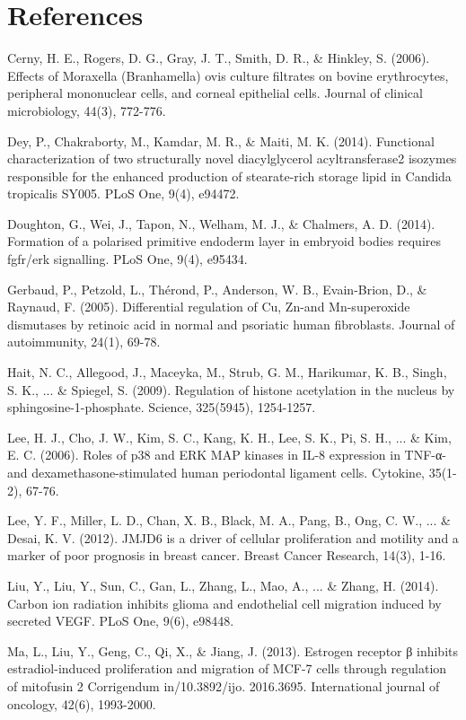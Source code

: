 \documentclass{article}
\begin{document}
\section{References}

Cerny, H. E., Rogers, D. G., Gray, J. T., Smith, D. R., \& Hinkley, S. (2006). Effects of Moraxella (Branhamella) ovis culture filtrates on bovine erythrocytes, peripheral mononuclear cells, and corneal epithelial cells. Journal of clinical microbiology, 44(3), 772-776.

Dey, P., Chakraborty, M., Kamdar, M. R., \& Maiti, M. K. (2014). Functional characterization of two structurally novel diacylglycerol acyltransferase2 isozymes responsible for the enhanced production of stearate-rich storage lipid in Candida tropicalis SY005. PLoS One, 9(4), e94472.

Doughton, G., Wei, J., Tapon, N., Welham, M. J., \& Chalmers, A. D. (2014). Formation of a polarised primitive endoderm layer in embryoid bodies requires fgfr/erk signalling. PLoS One, 9(4), e95434.

Gerbaud, P., Petzold, L., Thérond, P., Anderson, W. B., Evain-Brion, D., \& Raynaud, F. (2005). Differential regulation of Cu, Zn-and Mn-superoxide dismutases by retinoic acid in normal and psoriatic human fibroblasts. Journal of autoimmunity, 24(1), 69-78.

Hait, N. C., Allegood, J., Maceyka, M., Strub, G. M., Harikumar, K. B., Singh, S. K., ... \& Spiegel, S. (2009). Regulation of histone acetylation in the nucleus by sphingosine-1-phosphate. Science, 325(5945), 1254-1257.

Lee, H. J., Cho, J. W., Kim, S. C., Kang, K. H., Lee, S. K., Pi, S. H., ... \& Kim, E. C. (2006). Roles of p38 and ERK MAP kinases in IL-8 expression in TNF-α-and dexamethasone-stimulated human periodontal ligament cells. Cytokine, 35(1-2), 67-76.

Lee, Y. F., Miller, L. D., Chan, X. B., Black, M. A., Pang, B., Ong, C. W., ... \& Desai, K. V. (2012). JMJD6 is a driver of cellular proliferation and motility and a marker of poor prognosis in breast cancer. Breast Cancer Research, 14(3), 1-16.

Liu, Y., Liu, Y., Sun, C., Gan, L., Zhang, L., Mao, A., ... \& Zhang, H. (2014). Carbon ion radiation inhibits glioma and endothelial cell migration induced by secreted VEGF. PLoS One, 9(6), e98448.

Ma, L., Liu, Y., Geng, C., Qi, X., \& Jiang, J. (2013). Estrogen receptor β inhibits estradiol-induced proliferation and migration of MCF-7 cells through regulation of mitofusin 2 Corrigendum in/10.3892/ijo. 2016.3695. International journal of oncology, 42(6), 1993-2000.
\end{document}
